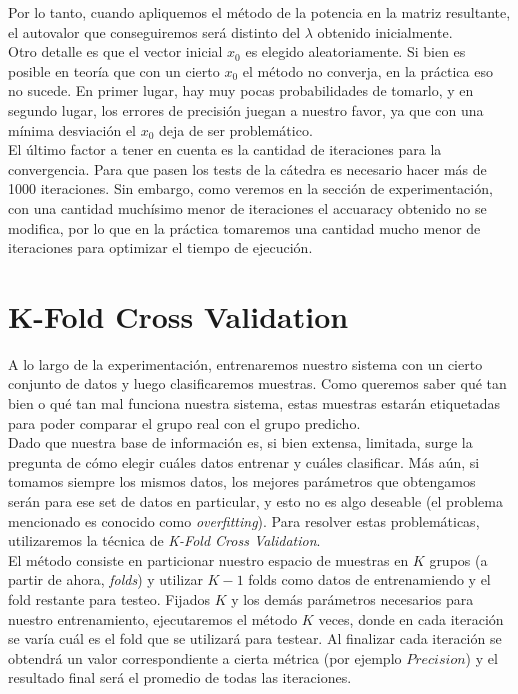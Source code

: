 Por lo tanto, cuando apliquemos el método de la potencia en la matriz resultante, el autovalor que conseguiremos será distinto del $\lambda$ obtenido inicialmente. \\

Otro detalle es que el vector inicial $x_0$ es elegido aleatoriamente. Si bien es posible en teoría que con un cierto $x_0$ el método no converja, en la práctica eso no sucede. En primer lugar, hay muy pocas probabilidades de tomarlo, y en segundo lugar, los errores de precisión juegan a nuestro favor, ya que con una mínima desviación el $x_0$ deja de ser problemático. \\

El último factor a tener en cuenta es la cantidad de iteraciones para la convergencia. Para que pasen los tests de la cátedra es necesario hacer más de 1000 iteraciones. Sin embargo, como veremos en la sección de experimentación, con una cantidad muchísimo menor de iteraciones el accuaracy obtenido no se modifica, por lo que en la práctica tomaremos una cantidad mucho menor de iteraciones para optimizar el tiempo de ejecución. \\

\newpage
\section{K-Fold Cross Validation}

A lo largo de la experimentación, entrenaremos nuestro sistema con un cierto conjunto de datos y luego clasificaremos muestras. Como queremos saber qué tan bien o qué tan mal funciona nuestra sistema, estas muestras estarán etiquetadas para poder comparar el grupo real con el grupo predicho. \\

Dado que nuestra base de información es, si bien extensa, limitada, surge la pregunta de cómo elegir cuáles datos entrenar y cuáles clasificar. Más aún, si tomamos siempre los mismos datos, los mejores parámetros que obtengamos serán para ese set de datos en particular, y esto no es algo deseable (el problema mencionado es conocido como \textit{overfitting}). Para resolver estas problemáticas, utilizaremos la técnica de \textit{K-Fold Cross Validation}. \\

El método consiste en particionar nuestro espacio de muestras en $K$ grupos (a partir de ahora, \textit{folds}) y utilizar $K - 1$ folds como datos de entrenamiendo y el fold restante para testeo. Fijados $K$ y los demás parámetros necesarios para nuestro entrenamiento, ejecutaremos el método $K$ veces, donde en cada iteración se varía cuál es el fold que se utilizará para testear. Al finalizar cada iteración se obtendrá un valor correspondiente a cierta métrica (por ejemplo $Precision$) y el resultado final será el promedio de todas las iteraciones. \\

